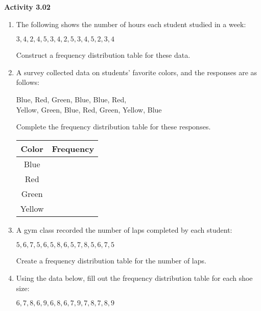 \vspace{0.3ex}
\noindent\textbf{Activity 3.02}

\vspace{0.2ex}


\begin{enumerate}[noitemsep, label = \color{blue}\arabic*.]
    \item The following shows the number of hours each student studied in a week:

      {\centering $ 3, 4, 2, 4, 5, 3, 4, 2, 5, 3, 4, 5, 2, 3, 4  $\par}
    Construct a frequency distribution table for these data.

  \item A survey collected data on students' favorite colors, and the responses are as follows:
    
   {\centering  Blue, Red, Green, Blue, Blue, Red,\\ Yellow, Green, Blue, Red, Green, Yellow, Blue \par}
    Complete the frequency distribution table for these responses.

    \begin{center}
    \begin{tabular}{|c|c|}
    \hline
    \textbf{Color} & \textbf{Frequency} \\
    \hline
    Blue & \\
    \hline
    Red & \\
    \hline
    Green & \\
    \hline
    Yellow & \\
    \hline
    \end{tabular}
    \end{center}

    \item A gym class recorded the number of laps completed by each student:

      {\centering $  5, 6, 7, 5, 6, 5, 8, 6, 5, 7, 8, 5, 6, 7, 5  $\par}
      
    Create a frequency distribution table for the number of laps.

    \item Using the data below, fill out the frequency distribution table for each shoe size:

     {\centering $  6, 7, 8, 6, 9, 6, 8, 6, 7, 9, 7, 8, 7, 8, 9  $\par}


\end{enumerate}
